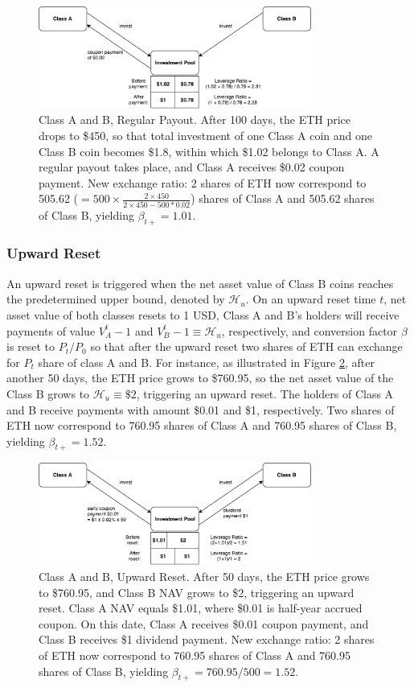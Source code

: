 \documentclass[draft, noinfoline]{ectaart}
\numberwithin{equation}{section}
\theoremstyle{plain}
\begin{document}
\begin{figure}[!htb]
	\centering
	\includegraphics[width=0.8\textwidth]{periodic}
	\caption{Class A and B, Regular Payout. After 100 days, the ETH price drops to \$450, so that total investment of one Class A coin and one Class B coin becomes \$1.8, within which \$1.02 belongs to Class A. A regular payout takes place, and Class A receives \$0.02 coupon payment. New exchange ratio: 2 shares of ETH now correspond to 505.62 ($=500\times\frac{2\times450}{2\times450-500*0.02}$) shares of Class A and 505.62 shares of Class B, yielding $\beta_{t+}=1.01$.}\label{fig:regular}
\end{figure}

\subsubsection{Upward Reset}
An upward reset is triggered when the net asset value of Class B coins reaches the predetermined upper bound, denoted by $\mathcal{H}_{u}$. On an upward reset time $t$, net asset value of both classes resets to 1 USD, Class A and B's holders will receive payments of value $V_{A}^{t}-1$ and $V_{B}^{t}-1\equiv \mathcal{H}_{u}$, respectively, and conversion factor $\beta$ is reset to $P_t/P_0$ so that after the upward reset two shares of ETH can exchange for $P_t$ share of class A and B. For instance, as illustrated in Figure \ref{fig:upward}, after another 50 days, the ETH price grows to \$760.95, so the net asset value of the Class B grows to $\mathcal{H}_{u}\equiv \$2$, triggering an upward reset. The holders of Class A and B receive payments with amount \$0.01 and \$1, respectively. Two shares of ETH now correspond to 760.95 shares of Class A and 760.95 shares of Class B, yielding $\beta_{t+}=1.52$.

\begin{figure}[!htb]
	\centering
	\includegraphics[width=0.8\textwidth]{upward}
	\caption{Class A and B, Upward Reset. After 50 days, the ETH price grows to \$760.95, and Class B NAV grows to \$2, triggering an upward reset. Class A NAV equals \$1.01, where \$0.01 is half-year accrued coupon. On this date, Class A receives \$0.01 coupon payment, and Class B receives \$1 dividend payment. New exchange ratio: 2 shares of ETH now correspond to 760.95 shares of Class A and 760.95 shares of Class B, yielding $\beta_{t+}=760.95/500=1.52$. }\label{fig:upward}
\end{figure}
\end{document}
